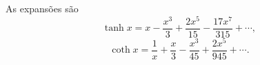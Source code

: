 As expansões são
\[
\tanh x = x - \frac{x^{3}}{3} + \frac{2x^{5}}{15} - \frac{17x^{7}}{315} + \cdots,
\]
\[
\coth x = \frac{1}{x} + \frac{x}{3} - \frac{x^{3}}{45} + \frac{2x^{5}}{945} + \cdots.
\]